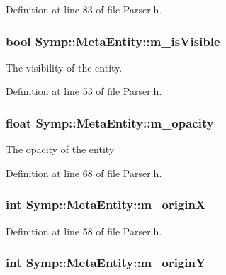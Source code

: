 Definition at line 83 of file Parser.\-h.

\hypertarget{struct_symp_1_1_meta_entity_a330c05dfb269e00b4baac0e9471d388f}{
\subsubsection[{m\-\_\-is\-Visible}]{\setlength{\rightskip}{0pt plus 5cm}bool Symp\-::\-Meta\-Entity\-::m\-\_\-is\-Visible}}\label{struct_symp_1_1_meta_entity_a330c05dfb269e00b4baac0e9471d388f}
The visibility of the entity. 

Definition at line 53 of file Parser.\-h.

\hypertarget{struct_symp_1_1_meta_entity_ae32c33284b8ffabecb2c5358294d2cb4}{
\subsubsection[{m\-\_\-opacity}]{\setlength{\rightskip}{0pt plus 5cm}float Symp\-::\-Meta\-Entity\-::m\-\_\-opacity}}\label{struct_symp_1_1_meta_entity_ae32c33284b8ffabecb2c5358294d2cb4}
The opacity of the entity 

Definition at line 68 of file Parser.\-h.

\hypertarget{struct_symp_1_1_meta_entity_a51906ceda9ebd508b87f275bf2506798}{
\subsubsection[{m\-\_\-origin\-X}]{\setlength{\rightskip}{0pt plus 5cm}int Symp\-::\-Meta\-Entity\-::m\-\_\-origin\-X}}\label{struct_symp_1_1_meta_entity_a51906ceda9ebd508b87f275bf2506798}


Definition at line 58 of file Parser.\-h.

\hypertarget{struct_symp_1_1_meta_entity_a352306cd387c39390a027809a4508a83}{
\subsubsection[{m\-\_\-origin\-Y}]{\setlength{\rightskip}{0pt plus 5cm}int Symp\-::\-Meta\-Entity\-::m\-\_\-origin\-Y}}\label{struct_symp_1_1_meta_entity_a352306cd387c39390a027809a4508a83}


